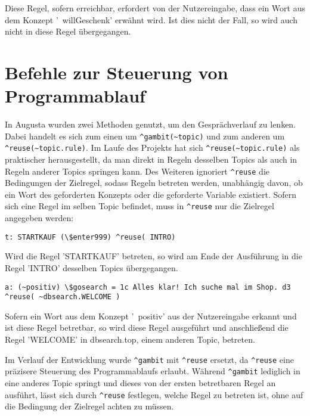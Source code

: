 Diese Regel, sofern erreichbar, erfordert von der Nutzereingabe, dass ein Wort aus dem Konzept '~willGeschenk' erwähnt wird. Ist dies nicht der Fall, so wird auch nicht in diese Regel übergegangen.


\section{Befehle zur Steuerung von Programmablauf}
\label{sec:ChatScript: Befehle zur Steuerung von Programmablauf}

In Augusta wurden zwei Methoden genutzt, um den Gesprächverlauf zu lenken. Dabei handelt es sich zum einen um \lstinline|^gambit(~topic)| und zum anderen um \lstinline|^reuse(~topic.rule)|. Im Laufe des Projekts hat sich \lstinline|^reuse(~topic.rule)| als praktischer herausgestellt, da man direkt in Regeln desselben Topics als auch in Regeln anderer Topics springen kann. Des Weiteren ignoriert \lstinline|^reuse| die Bedingungen der Zielregel, sodass Regeln betreten werden, unabhängig davon, ob ein Wort des geforderten Konzepts oder die geforderte Variable existiert. Sofern sich eine Regel im selben Topic befindet, muss in \lstinline|^reuse| nur die Zielregel angegeben werden:

\begin{lstlisting}[caption={Regel STARTKAUF in kaufabsicht.top}]
t: STARTKAUF (\$enter999) ^reuse( INTRO)
\end{lstlisting}

Wird die Regel 'STARTKAUF' betreten, so wird am Ende der Ausführung in die Regel 'INTRO' desselben Topics übergegangen. 

\begin{lstlisting}[caption={Regel in keyexonesentence.top}]
a: (~positiv) \$gosearch = 1c Alles klar! Ich suche mal im Shop. d3 ^reuse( ~dbsearch.WELCOME )
\end{lstlisting}

Sofern ein Wort aus dem Konzept '~positiv' aus der Nutzereingabe erkannt und ist diese Regel betretbar, so wird diese Regel ausgeführt und anschließend die Regel 'WELCOME' in dbsearch.top, einem anderen Topic, betreten.

Im Verlauf der Entwicklung wurde \lstinline|^gambit| mit \lstinline|^reuse| ersetzt, da \lstinline|^reuse| eine präzisere Steuerung des Programmablaufs erlaubt. Während \lstinline|^gambit| lediglich in eine anderes Topic springt und dieses von der ersten betretbaren Regel an ausführt, lässt sich durch \lstinline|^reuse| festlegen, welche Regel zu betreten ist, ohne auf die Bedingung der Zielregel achten zu müssen.  


